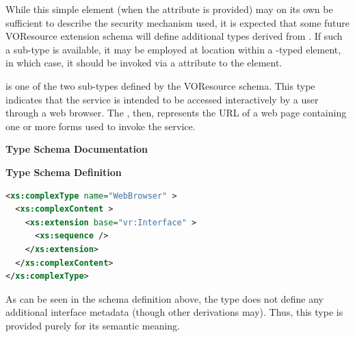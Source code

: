 \documentclass[11pt,a4paper]{ivoa}
\begin{document}

While this simple element (when the  attribute
is provided) may on its own be sufficient to describe the security
mechanism used, it is expected that some future
VOResource extension schema will define
additional types derived from .  If such
a sub-type is available, it may be employed at
 location within a
-typed element, in which case, it should be
invoked via a  attribute to the
 element.  


 is one of the two 
sub-types defined by the VOResource schema.  This type indicates that
the service is intended to be accessed interactively by a user through
a web browser.  The , then, represents
the URL of a web page containing one or more forms used to invoke the
service. 


\begin{generated}
\begingroup
      	\renewcommand*\descriptionlabel[1]{%
      	\hbox to 5.5em{\emph{#1}\hfil}}\vspace{2ex}\noindent\textbf{ Type Schema Documentation}



\vspace{1ex}\noindent\textbf{ Type Schema Definition}

\begin{lstlisting}[language=XML,basicstyle=\footnotesize]
<xs:complexType name="WebBrowser" >
  <xs:complexContent >
    <xs:extension base="vr:Interface" >
      <xs:sequence />
    </xs:extension>
  </xs:complexContent>
</xs:complexType>
\end{lstlisting}\endgroup
\end{generated}



As can be seen in the schema definition above, the
 type does not define any additional
interface metadata (though other  derivations
may).  Thus, this type is provided purely for its semantic meaning.  
\end{document}
